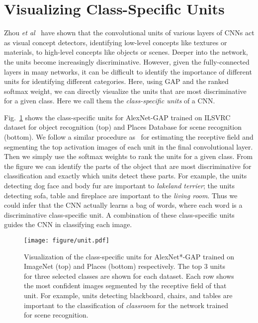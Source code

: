 \documentclass[10pt,twocolumn,letterpaper]{article}
\begin{document}
\section{Visualizing Class-Specific Units}

Zhou \textit{et al}~\cite{zhou2014object} have shown that the convolutional units of various layers of CNNs act as visual concept detectors, identifying  low-level concepts like textures or materials, to high-level concepts like objects or scenes. Deeper into the network, the units become increasingly discriminative. However, given the fully-connected layers in many networks, it can be difficult to identify the importance of different units for identifying different categories. Here, using GAP and the ranked softmax weight, we can directly visualize the units that are most discriminative for a given class. Here we call them the \textit{class-specific units} of a CNN. 

Fig.~\ref{fig:unitvisualization} shows the class-specific units for AlexNet-GAP trained on ILSVRC dataset for object recognition (top) and Places Database for scene recognition (bottom).
We follow a similar procedure as~\cite{zhou2014object} for estimating the receptive field and segmenting the top activation images of each unit in the final convolutional layer. Then we simply use the softmax weights to rank the units for a given class. From the figure we can identify the parts of the object that are most discriminative for classification and exactly which units detect these parts. For example, the units detecting dog face and body fur are important to  \textit{lakeland terrier}; the units detecting sofa, table and fireplace are important to the  \textit{living room}. Thus we could infer that the CNN actually learns a bag of words, where each word is a discriminative class-specific unit. A combination of these class-specific units guides the CNN in classifying each image.


\begin{figure}
\begin{center}
 \texttt{[image: figure/unit.pdf]}
\end{center}
\vspace*{-4mm}
\caption{Visualization of the class-specific units for AlexNet*-GAP trained on ImageNet (top) and Places (bottom) respectively. The top 3 units for three selected classes are shown for each dataset. Each row shows the most confident images segmented by the receptive field of that unit. For example, units detecting blackboard, chairs, and tables are important to the classification of  \textit{classroom} for the network trained for scene recognition.}
\label{fig:unitvisualization}
\end{figure}
\end{document}
